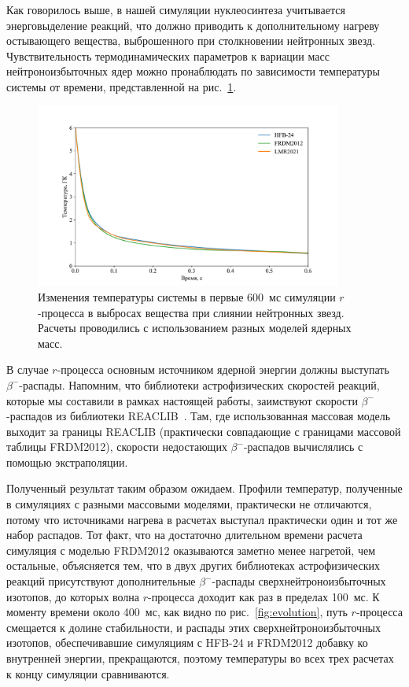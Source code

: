 Как говорилось выше, в нашей симуляции нуклеосинтеза учитывается энерговыделение реакций, что должно приводить к дополнительному нагреву остывающего вещества, выброшенного при столкновении нейтронных звезд. Чувствительность термодинамических параметров к вариации масс нейтроноизбыточных ядер можно пронаблюдать по зависимости температуры системы от времени, представленной на рис.~\ref{fig:temp}.

\begin{figure}
\centering
\includegraphics[width=0.9\textwidth]{pics/temp.pdf}
\caption{Изменения температуры системы в первые 600~мс симуляции $r$-процесса в выбросах вещества при слиянии нейтронных звезд. Расчеты проводились с использованием разных моделей ядерных масс.}
\label{fig:temp}
\end{figure}

В случае $r$-процесса основным источником ядерной энергии должны выступать $\beta^-$-распады. Напомним, что библиотеки астрофизических скоростей реакций, которые мы составили в рамках настоящей работы, заимствуют скорости $\beta^-$-распадов из библиотеки REACLIB~\cite{reaclib2010}. Там, где использованная массовая модель выходит за границы REACLIB (практически совпадающие с границами массовой таблицы FRDM2012), скорости недостающих $\beta^-$-распадов вычислялись с помощью экстраполяции.

Полученный результат таким образом ожидаем. Профили температур, полученные в симуляциях с разными массовыми моделями, практически не отличаются, потому что источниками нагрева в расчетах выступал практически один и тот же набор распадов. Тот факт, что на достаточно длительном времени расчета симуляция с моделью FRDM2012 оказываются заметно менее нагретой, чем остальные, объясняется тем, что в двух других библиотеках астрофизических реакций присутствуют дополнительные $\beta^-$-распады сверхнейтроноизбыточных изотопов, до которых волна $r$-процесса доходит как раз в пределах 100~мс. К моменту времени около 400~мс, как видно по рис.~\ref{fig:evolution}, путь $r$-процесса смещается к долине стабильности, и распады этих сверхнейтроноизбыточных изотопов, обеспечивавшие симуляциям с HFB-24 и FRDM2012 добавку ко внутренней энергии, прекращаются, поэтому температуры во всех трех расчетах к концу симуляции сравниваются. 

